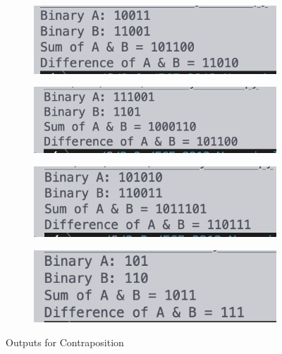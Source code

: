 \begin{figure}[H]
    \begin{subfigure}{.5\textwidth}
        \centering
        \includegraphics[width=.8\linewidth]{images/output/bin1.png}
        \caption*{}
        \label{fig:bin1}
    \end{subfigure}
    \begin{subfigure}{.5\textwidth}
        \centering
        \includegraphics[width=.8\linewidth]{images/output/bin2.png}
        \caption*{}
        \label{fig:bin2}
    \end{subfigure}
    \newline
    \begin{subfigure}{.5\textwidth}
        \centering
        \includegraphics[width=.8\linewidth]{images/output/bin3.png}
        \caption*{}
        \label{fig:bin3}
    \end{subfigure}
    \begin{subfigure}{.5\textwidth}
        \centering
        \includegraphics[width=.8\linewidth]{images/output/bin4.png}
        \caption*{}
        \label{fig:bin4}
    \end{subfigure}
    \caption{Outputs for Contraposition}
    \label{fig:bin}
\end{figure}

